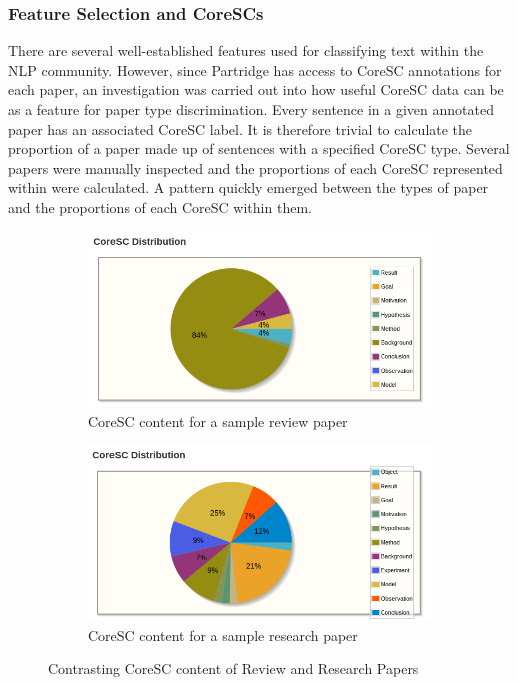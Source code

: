 \subsubsection{Feature Selection and CoreSCs}

There are several well-established features used for classifying text within
the NLP community. However, since Partridge has access to CoreSC annotations
for each paper, an investigation was carried out into how useful CoreSC data
can be as a feature for paper type discrimination. Every sentence in a given
annotated paper has an associated CoreSC label. It is therefore trivial to
calculate the proportion of a paper made up of sentences with a specified
CoreSC type. Several papers were manually inspected and the proportions of each
CoreSC represented within were calculated. A pattern quickly emerged between
the types of paper and the proportions of each CoreSC within them. 

\begin{figure}[!h]
\centering
\begin{subfigure}[b]{0.6\textwidth}
\includegraphics[width=\textwidth]{images/implementation/review_corescs.png}
\caption{CoreSC content for a sample review paper}
\end{subfigure}
\begin{subfigure}[b]{0.6\textwidth}
\includegraphics[width=\textwidth]{images/implementation/report_corescs.png}
\caption{CoreSC content for a sample research paper}
\end{subfigure}

\caption{Contrasting CoreSC content of Review and Research Papers}
\label{fig:coresc_pies}
\end{figure}

